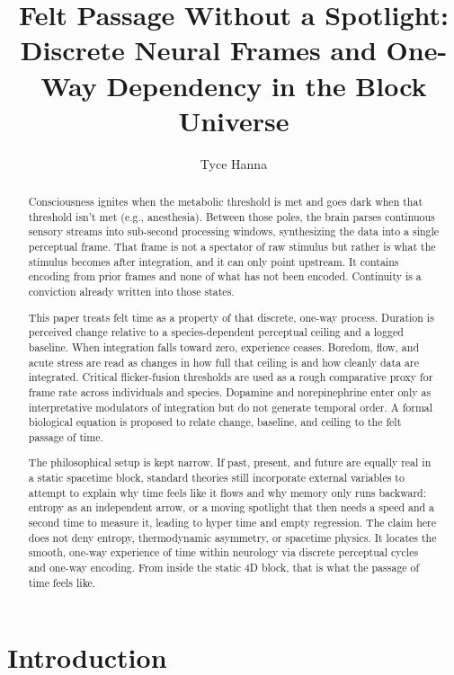 \documentclass[11pt,a4paper]{article}
\title{Felt Passage Without a Spotlight: Discrete Neural Frames and One-Way Dependency in the Block Universe}
\author{Tyce Hanna}
\begin{document}
\maketitle

\begin{abstract}

Consciousness ignites when the metabolic threshold is met and goes dark when that threshold isn't met (e.g., anesthesia). Between those poles, the brain parses continuous sensory streams into sub-second processing windows, synthesizing the data into a single perceptual frame. That frame is not a spectator of raw stimulus but rather is what the stimulus becomes after integration, and it can only point upstream. It contains encoding from prior frames and none of what has not been encoded. Continuity is a conviction already written into those states.

This paper treats felt time as a property of that discrete, one-way process. Duration is perceived change relative to a species-dependent perceptual ceiling and a logged baseline. When integration falls toward zero, experience ceases. Boredom, flow, and acute stress are read as changes in how full that ceiling is and how cleanly data are integrated. Critical flicker-fusion thresholds are used as a rough comparative proxy for frame rate across individuals and species. Dopamine and norepinephrine enter only as interpretative modulators of integration but do not generate temporal order. A formal biological equation is proposed to relate change, baseline, and ceiling to the felt passage of time.

The philosophical setup is kept narrow. If past, present, and future are equally real in a static spacetime block, standard theories still incorporate external variables to attempt to explain why time feels like it flows and why memory only runs backward: entropy as an independent arrow, or a moving spotlight that then needs a speed and a second time to measure it, leading to hyper time and empty regression. The claim here does not deny entropy, thermodynamic asymmetry, or spacetime physics. It locates the smooth, one-way experience of time within neurology via discrete perceptual cycles and one-way encoding. From inside the static 4D block, that is what the passage of time feels like.

\end{abstract}

\section{Introduction}
\end{document}
